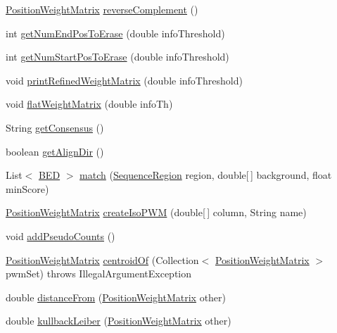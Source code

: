 \begin{DoxyCompactItemize}
\hyperlink{classbroad_1_1core_1_1motif_1_1_position_weight_matrix}{Position\+Weight\+Matrix} \hyperlink{classbroad_1_1core_1_1motif_1_1_position_weight_matrix_a094eef930d034e04706e1a9326355d5a}{reverse\+Complement} ()
\item 
int \hyperlink{classbroad_1_1core_1_1motif_1_1_position_weight_matrix_afd512d123d1e3ac15a2a6294f160024a}{get\+Num\+End\+Pos\+To\+Erase} (double info\+Threshold)
\item 
int \hyperlink{classbroad_1_1core_1_1motif_1_1_position_weight_matrix_a493b3736cd07a224265e66cd1609624c}{get\+Num\+Start\+Pos\+To\+Erase} (double info\+Threshold)
\item 
void \hyperlink{classbroad_1_1core_1_1motif_1_1_position_weight_matrix_a05b298bc6d5b5424e961f8da9742d02f}{print\+Refined\+Weight\+Matrix} (double info\+Threshold)
\item 
void \hyperlink{classbroad_1_1core_1_1motif_1_1_position_weight_matrix_a96513be0b770e7216971489d55a5ed11}{flat\+Weight\+Matrix} (double info\+Th)
\item 
String \hyperlink{classbroad_1_1core_1_1motif_1_1_position_weight_matrix_a13a21c2d909695d4bab505ca1743fb4e}{get\+Consensus} ()
\item 
boolean \hyperlink{classbroad_1_1core_1_1motif_1_1_position_weight_matrix_ad0d1df880623b3436db55e212fe61486}{get\+Align\+Dir} ()
\item 
List$<$ \hyperlink{classbroad_1_1core_1_1annotation_1_1_b_e_d}{B\+E\+D} $>$ \hyperlink{classbroad_1_1core_1_1motif_1_1_position_weight_matrix_a3b83d9fb74cd24fa5256f0e66af3d353}{match} (\hyperlink{classbroad_1_1core_1_1sequence_1_1_sequence_region}{Sequence\+Region} region, double\mbox{[}$\,$\mbox{]} background, float min\+Score)
\item 
\hyperlink{classbroad_1_1core_1_1motif_1_1_position_weight_matrix}{Position\+Weight\+Matrix} \hyperlink{classbroad_1_1core_1_1motif_1_1_position_weight_matrix_a566b285edf5ae045f8af3ed12a0eb549}{create\+Iso\+P\+W\+M} (double\mbox{[}$\,$\mbox{]} column, String name)
\item 
void \hyperlink{classbroad_1_1core_1_1motif_1_1_position_weight_matrix_a5ccc8f8ea80fd1b0d6527af85b8da13c}{add\+Pseudo\+Counts} ()
\item 
\hyperlink{classbroad_1_1core_1_1motif_1_1_position_weight_matrix}{Position\+Weight\+Matrix} \hyperlink{classbroad_1_1core_1_1motif_1_1_position_weight_matrix_affcf048fc62fc2a720bc87b63b4028ee}{centroid\+Of} (Collection$<$ \hyperlink{classbroad_1_1core_1_1motif_1_1_position_weight_matrix}{Position\+Weight\+Matrix} $>$ pwm\+Set)  throws Illegal\+Argument\+Exception
\item 
double \hyperlink{classbroad_1_1core_1_1motif_1_1_position_weight_matrix_a42ff0497e33c079daf6a5181855a5859}{distance\+From} (\hyperlink{classbroad_1_1core_1_1motif_1_1_position_weight_matrix}{Position\+Weight\+Matrix} other)
\item 
double \hyperlink{classbroad_1_1core_1_1motif_1_1_position_weight_matrix_ac5ec4f45ec2cbcc6a70671b6d97f304a}{kullback\+Leiber} (\hyperlink{classbroad_1_1core_1_1motif_1_1_position_weight_matrix}{Position\+Weight\+Matrix} other)
\end{DoxyCompactItemize}
